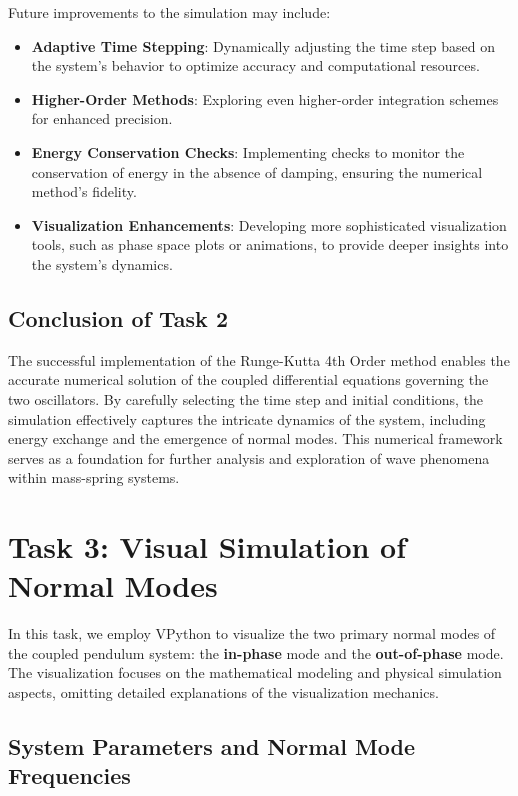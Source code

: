 \documentclass[12pt]{report} %
\begin{document}
    Future improvements to the simulation may include:
    \begin{itemize}
        \item \textbf{Adaptive Time Stepping}: Dynamically adjusting the time step based on the system's behavior to optimize accuracy and computational resources.
        \item \textbf{Higher-Order Methods}: Exploring even higher-order integration schemes for enhanced precision.
        \item \textbf{Energy Conservation Checks}: Implementing checks to monitor the conservation of energy in the absence of damping, ensuring the numerical method's fidelity.
        \item \textbf{Visualization Enhancements}: Developing more sophisticated visualization tools, such as phase space plots or animations, to provide deeper insights into the system's dynamics.
    \end{itemize}
    
    \subsection{Conclusion of Task 2}
    \label{subsec:part1_task2_conclusion}
    
    The successful implementation of the Runge-Kutta 4th Order method enables the accurate numerical solution of the coupled differential equations governing the two oscillators. By carefully selecting the time step and initial conditions, the simulation effectively captures the intricate dynamics of the system, including energy exchange and the emergence of normal modes. This numerical framework serves as a foundation for further analysis and exploration of wave phenomena within mass-spring systems.
    
    \newpage
        

    \section{Task 3: Visual Simulation of Normal Modes}
\label{sec:part1_task3}

In this task, we employ VPython to visualize the two primary normal modes of the coupled pendulum system: the \textbf{in-phase} mode and the \textbf{out-of-phase} mode. The visualization focuses on the mathematical modeling and physical simulation aspects, omitting detailed explanations of the visualization mechanics.

\subsection{System Parameters and Normal Mode Frequencies}
\label{subsec:part1_task3_parameters}
\end{document}
